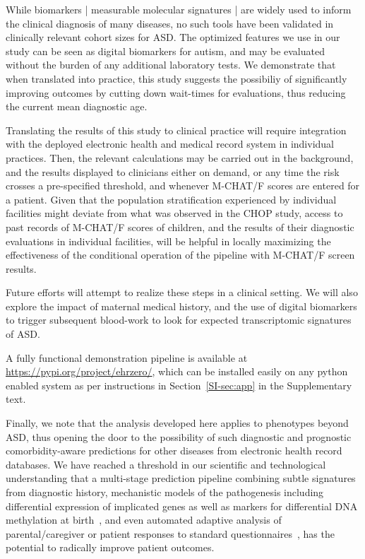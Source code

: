 \documentclass[onecolumn,,10pt]{IEEEtran}
\begin{document}
While biomarkers | measurable molecular signatures | are widely used to inform the clinical diagnosis of many diseases, no such tools have been validated in clinically relevant cohort sizes for ASD.  The optimized features we use in our study can be seen as digital biomarkers for autism, and may be evaluated  without the burden of any additional laboratory tests. We demonstrate that when translated into practice, this study suggests the possibiliy of significantly improving outcomes by cutting down wait-times for evaluations, thus reducing the current mean diagnostic age.

Translating the results of this study to clinical practice  will require integration with the deployed electronic health and medical record system in individual practices. Then, the relevant calculations may be carried out in the background, and the results displayed to clinicians either on demand, or any time the risk crosses a pre-specified threshold, and whenever M-CHAT/F scores are entered for a patient.
Given that the population stratification experienced by individual facilities might deviate from what was observed in the CHOP study, access to past records of M-CHAT/F scores of children, and the results of their diagnostic evaluations in individual facilities, will be helpful in  locally maximizing  the effectiveness of the conditional operation of the   pipeline with M-CHAT/F screen results.

Future efforts will attempt to realize these steps in a clinical setting. We will also explore the impact of  maternal medical history, and the  use of digital biomarkers to trigger  subsequent blood-work to look for expected  transcriptomic  signatures of ASD.

A fully functional demonstration pipeline is available at \href{https://pypi.org/project/ehrzero/}{https://pypi.org/project/ehrzero/}, which can be installed easily on any python enabled system as per instructions in  Section~\ref{SI-sec:app} in the Supplementary text.

Finally, we note that the analysis developed here applies to phenotypes beyond ASD, thus opening the door to the possibility of such diagnostic and prognostic comorbidity-aware predictions for other diseases from electronic health record databases.
%
We have reached a threshold in our scientific and technological understanding that a multi-stage prediction pipeline combining subtle signatures from diagnostic history, mechanistic models of the pathogenesis including differential expression of implicated genes as well as markers for differential DNA methylation at birth~\cite{pmid29587883}, and even automated adaptive  analysis of parental/caregiver or patient responses to standard questionnaires~\cite{pmid23945443}, has the potential to radically improve patient outcomes.
\end{document}
